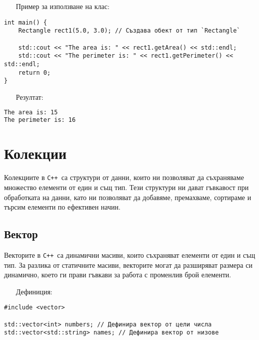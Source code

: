 \documentclass[oneside]{book}
\newcommand*{\cpp}{\texttt{C++}\ }
\begin{document}
\begin{itemize}\item[Пример] за използване на клас:\end{itemize}
\begin{mdframed}\begin{lstlisting}
int main() {
    Rectangle rect1(5.0, 3.0); // Създава обект от тип `Rectangle`

    std::cout << "The area is: " << rect1.getArea() << std::endl;
    std::cout << "The perimeter is: " << rect1.getPerimeter() << std::endl;
    return 0;
}
\end{lstlisting}\end{mdframed}

\begin{itemize}\item[Резултат:]\end{itemize}
\begin{mdframed}\begin{lstlisting}[language=bash]
The area is: 15
The perimeter is: 16
\end{lstlisting}\end{mdframed}

\section{Колекции}
Колекциите в \cpp са структури от данни, които ни позволяват да съхраняваме множество елементи от един и същ тип. Тези структури ни дават гъвкавост при обработката на данни, като ни позволяват да добавяме, премахваме, сортираме и търсим елементи по ефективен начин.

\subsection{Вектор}
Векторите в \cpp са динамични масиви, които съхраняват елементи от един и същ тип. За разлика от статичните масиви, векторите могат да разширяват размера си динамично, което ги прави гъвкави за работа с променлив брой елементи.

\begin{itemize}\item[Дефиниция:]\end{itemize}
\begin{mdframed}\begin{lstlisting}
#include <vector>

std::vector<int> numbers; // Дефинира вектор от цели числа
std::vector<std::string> names; // Дефинира вектор от низове
\end{lstlisting}\end{mdframed}
\end{document}
